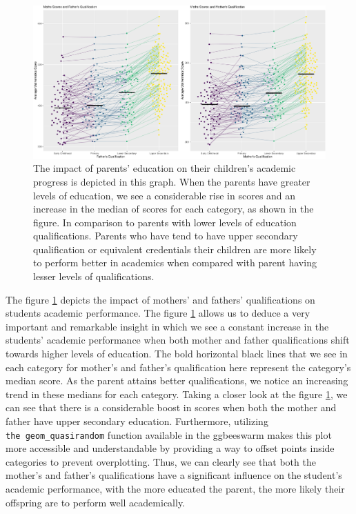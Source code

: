 \begin{Schunk}
\begin{figure}[H]
\includegraphics[width=1\linewidth]{learningtower_files/figure-latex/qual-plot-1} \caption[The impact of parents' education on their children's academic progress is depicted in this graph]{The impact of parents' education on their children's academic progress is depicted in this graph. When the parents have greater levels of education, we see a considerable rise in scores and an increase in the median of scores for each category, as shown in the figure. In comparison to parents with lower levels of education qualifications. Parents who have tend to have upper secondary qualification or equivalent credentials their children are more likely to perform better in academics when compared with parent having lesser levels of qualifications.}\label{fig:qual-plot}
\end{figure}
\end{Schunk}

The figure \ref{fig:qual-plot} depicts the impact of mothers' and
fathers' qualifications on students academic performance. The figure
\ref{fig:qual-plot} allows us to deduce a very important and remarkable
insight in which we see a constant increase in the students' academic
performance when both mother and father qualifications shift towards
higher levels of education. The bold horizontal black lines that we see
in each category for mother's and father's qualification here represent
the category's median score. As the parent attains better
qualifications, we notice an increasing trend in these medians for each
category. Taking a closer look at the figure \ref{fig:qual-plot}, we can
see that there is a considerable boost in scores when both the mother
and father have upper secondary education. Furthermore, utilizing
\texttt{the\ geom\_quasirandom} function available in the
 \citep{ggbeeswarm}ggbeeswarm makes this plot more
accessible and understandable by providing a way to offset points inside
categories to prevent overplotting. Thus, we can clearly see that both
the mother's and father's qualifications have a significant influence on
the student's academic performance, with the more educated the parent,
the more likely their offspring are to perform well academically.

